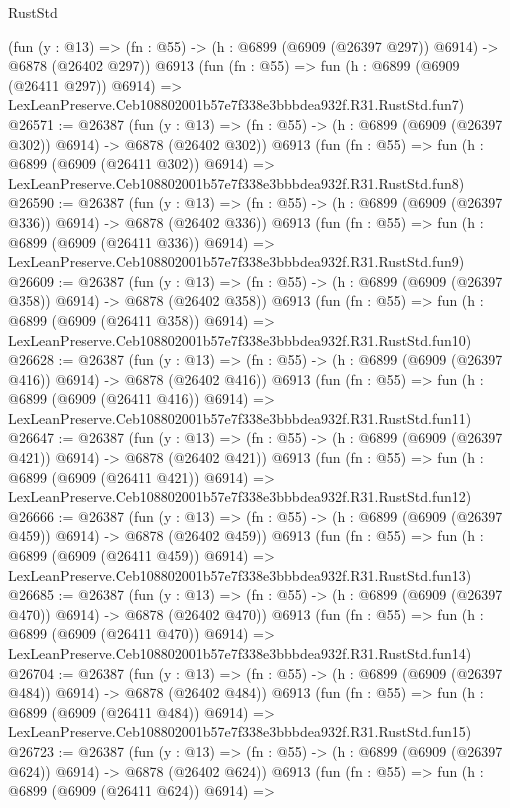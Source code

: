 \begin{lexlean}{RustStd}
\begin{coremodule}
    (fun (y : @13) => (fn : @55) -> (h : @6899 (@6909 (@26397 @297)) @6914) -> @6878 (@26402 @297))
    @6913
    (fun (fn : @55) =>
    fun (h : @6899 (@6909 (@26411 @297)) @6914) =>
    LexLeanPreserve.Ceb108802001b57e7f338e3bbbdea932f.R31.RustStd.fun7)
@26571 := @26387
    (fun (y : @13) => (fn : @55) -> (h : @6899 (@6909 (@26397 @302)) @6914) -> @6878 (@26402 @302))
    @6913
    (fun (fn : @55) =>
    fun (h : @6899 (@6909 (@26411 @302)) @6914) =>
    LexLeanPreserve.Ceb108802001b57e7f338e3bbbdea932f.R31.RustStd.fun8)
@26590 := @26387
    (fun (y : @13) => (fn : @55) -> (h : @6899 (@6909 (@26397 @336)) @6914) -> @6878 (@26402 @336))
    @6913
    (fun (fn : @55) =>
    fun (h : @6899 (@6909 (@26411 @336)) @6914) =>
    LexLeanPreserve.Ceb108802001b57e7f338e3bbbdea932f.R31.RustStd.fun9)
@26609 := @26387
    (fun (y : @13) => (fn : @55) -> (h : @6899 (@6909 (@26397 @358)) @6914) -> @6878 (@26402 @358))
    @6913
    (fun (fn : @55) =>
    fun (h : @6899 (@6909 (@26411 @358)) @6914) =>
    LexLeanPreserve.Ceb108802001b57e7f338e3bbbdea932f.R31.RustStd.fun10)
@26628 := @26387
    (fun (y : @13) => (fn : @55) -> (h : @6899 (@6909 (@26397 @416)) @6914) -> @6878 (@26402 @416))
    @6913
    (fun (fn : @55) =>
    fun (h : @6899 (@6909 (@26411 @416)) @6914) =>
    LexLeanPreserve.Ceb108802001b57e7f338e3bbbdea932f.R31.RustStd.fun11)
@26647 := @26387
    (fun (y : @13) => (fn : @55) -> (h : @6899 (@6909 (@26397 @421)) @6914) -> @6878 (@26402 @421))
    @6913
    (fun (fn : @55) =>
    fun (h : @6899 (@6909 (@26411 @421)) @6914) =>
    LexLeanPreserve.Ceb108802001b57e7f338e3bbbdea932f.R31.RustStd.fun12)
@26666 := @26387
    (fun (y : @13) => (fn : @55) -> (h : @6899 (@6909 (@26397 @459)) @6914) -> @6878 (@26402 @459))
    @6913
    (fun (fn : @55) =>
    fun (h : @6899 (@6909 (@26411 @459)) @6914) =>
    LexLeanPreserve.Ceb108802001b57e7f338e3bbbdea932f.R31.RustStd.fun13)
@26685 := @26387
    (fun (y : @13) => (fn : @55) -> (h : @6899 (@6909 (@26397 @470)) @6914) -> @6878 (@26402 @470))
    @6913
    (fun (fn : @55) =>
    fun (h : @6899 (@6909 (@26411 @470)) @6914) =>
    LexLeanPreserve.Ceb108802001b57e7f338e3bbbdea932f.R31.RustStd.fun14)
@26704 := @26387
    (fun (y : @13) => (fn : @55) -> (h : @6899 (@6909 (@26397 @484)) @6914) -> @6878 (@26402 @484))
    @6913
    (fun (fn : @55) =>
    fun (h : @6899 (@6909 (@26411 @484)) @6914) =>
    LexLeanPreserve.Ceb108802001b57e7f338e3bbbdea932f.R31.RustStd.fun15)
@26723 := @26387
    (fun (y : @13) => (fn : @55) -> (h : @6899 (@6909 (@26397 @624)) @6914) -> @6878 (@26402 @624))
    @6913
    (fun (fn : @55) =>
    fun (h : @6899 (@6909 (@26411 @624)) @6914) =>

\end{coremodule}
\end{lexlean}
